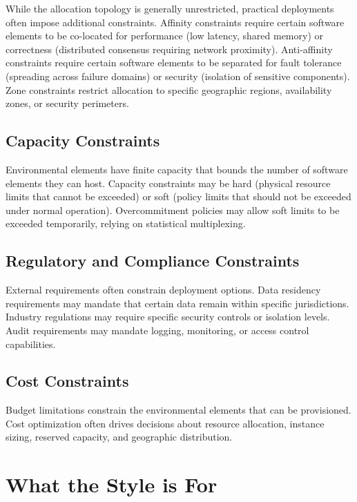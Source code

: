 \documentclass[11pt]{article}
\begin{document}
While the allocation topology is generally unrestricted, practical deployments often impose additional constraints. Affinity constraints require certain software elements to be co-located for performance (low latency, shared memory) or correctness (distributed consensus requiring network proximity). Anti-affinity constraints require certain software elements to be separated for fault tolerance (spreading across failure domains) or security (isolation of sensitive components). Zone constraints restrict allocation to specific geographic regions, availability zones, or security perimeters.

\subsection{Capacity Constraints}

Environmental elements have finite capacity that bounds the number of software elements they can host. Capacity constraints may be hard (physical resource limits that cannot be exceeded) or soft (policy limits that should not be exceeded under normal operation). Overcommitment policies may allow soft limits to be exceeded temporarily, relying on statistical multiplexing.

\subsection{Regulatory and Compliance Constraints}

External requirements often constrain deployment options. Data residency requirements may mandate that certain data remain within specific jurisdictions. Industry regulations may require specific security controls or isolation levels. Audit requirements may mandate logging, monitoring, or access control capabilities.

\subsection{Cost Constraints}

Budget limitations constrain the environmental elements that can be provisioned. Cost optimization often drives decisions about resource allocation, instance sizing, reserved capacity, and geographic distribution.

\section{What the Style is For}
\end{document}
